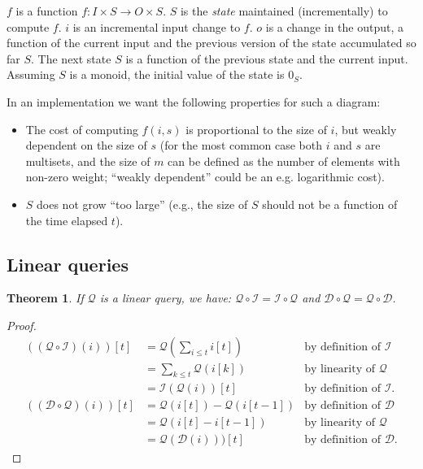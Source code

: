 \documentclass[10pt]{article}
\newtheorem{theorem}{Theorem}[section]
\newcommand{\zm}{\ensuremath{z^{-1}}} %
\newcommand{\I}{\mathcal{I}}  %
\newcommand{\D}{\mathcal{D}}  %
\newcommand{\q}{\ensuremath{\mathcal{Q}}}  %
\begin{document}

$f$ is a function $f: I \times S \rightarrow O \times S$.  $S$ is the
\emph{state} maintained (incrementally) to compute $f$.  $i$ is an
incremental input change to $f$.  $o$ is a change in the output, a
function of the current input and the previous version of the state
accumulated so far $S$.  The next state $S$ is a function of the
previous state and the current input.  Assuming $S$ is a monoid, the
initial value of the state is $0_S$.

In an implementation we want the following properties for such a
diagram:
\begin{itemize}
  \item The cost of computing $f(i, s)$ is proportional to the size of
    $i$, but weakly dependent on the size of $s$ (for the most common
    case both $i$ and $s$ are multisets, and the size of $m$ can be
    defined as the number of elements with non-zero weight; ``weakly
    dependent'' could be an e.g. logarithmic cost).
  \item $S$ does not grow ``too large'' (e.g., the size of $S$ should
    not be a function of the time elapsed $t$).
\end{itemize}

\subsection{Linear queries}

\begin{theorem}
If $\q$ is a linear query, we have: $\q \circ \I = \I \circ \q$ and
$\D \circ \q = \q \circ \D$.
\end{theorem}
\begin{proof}
$$
\begin{aligned}
  ((\q \circ \I)(i))[t] &= \q(\sum_{i \leq t} i[t]) & \mbox{by definition of }\I \\
  &= \sum_{k \leq t} \q(i[k]) & \mbox{by linearity of }\q \\
  &= \I(\q(i))[t] & \mbox{by definition of }\I. \\
  ((\D \circ \q)(i))[t] &= \q(i[t]) - \q(i[t-1]) & \mbox{by definition of }\D \\
  &= \q(i[t] - i[t-1]) & \mbox{by linearity of }\q \\
  &= \q(\D(i)))[t] & \mbox{by definition of }\D.
\end{aligned}
$$
\end{proof}
\end{document}
